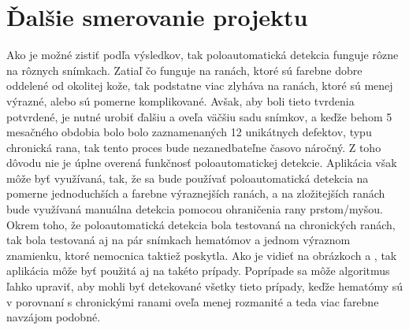 \section{Ďalšie smerovanie projektu}
Ako je možné zistiť podľa výsledkov, tak poloautomatická detekcia funguje rôzne na rôznych snímkach. Zatiaľ čo funguje na ranách, ktoré sú farebne dobre oddelené od okolitej kože, tak podstatne viac zlyháva na ranách, ktoré sú menej výrazné, alebo sú pomerne komplikované. Avšak, aby boli tieto tvrdenia potvrdené, je nutné urobiť ďalšiu a oveľa väčšiu sadu snímkov, a keďže behom 5 mesačného obdobia bolo bolo zaznamenaných 12 unikátnych defektov, typu chronická rana, tak tento proces bude nezanedbateľne časovo náročný. Z toho dôvodu nie je úplne overená funkčnosť poloautomatickej detekcie. Aplikácia však môže byť využívaná, tak, že sa bude používať poloautomatická detekcia na pomerne jednoduchších a farebne výraznejších ranách, a na zložitejších ranách bude využívaná manuálna detekcia pomocou ohraničenia rany prstom/myšou. Okrem toho, že poloautomatická detekcia bola testovaná na chronických ranách, tak bola testovaná aj na pár snímkach hematómov a jednom výraznom znamienku, ktoré nemocnica taktiež poskytla. Ako je vidieť na obrázkoch \label{fig:w2} a \label{fig:w3}, tak aplikácia môže byť použitá aj na takéto prípady. Poprípade sa môže algoritmus ľahko upraviť, aby mohli byť detekované všetky tieto prípady, keďže hematómy sú v porovnaní s chronickými ranami oveľa menej rozmanité a teda viac farebne navzájom podobné.
